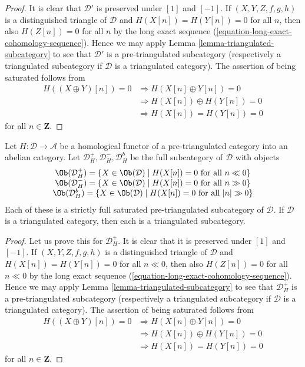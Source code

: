 \begin{proof}
It is clear that $\mathcal{D}'$ is preserved under $[1]$ and $[-1]$.
If $(X, Y, Z, f, g, h)$ is a distinguished triangle of $\mathcal{D}$
and $H(X[n]) = H(Y[n]) = 0$ for all $n$, then also $H(Z[n]) = 0$ for all $n$
by the long exact sequence (\ref{equation-long-exact-cohomology-sequence}).
Hence we may apply
Lemma \ref{lemma-triangulated-subcategory}
to see that $\mathcal{D}'$ is a pre-triangulated subcategory (respectively
a triangulated subcategory if $\mathcal{D}$ is a triangulated category).
The assertion of being saturated follows from
\begin{align*}
H((X \oplus Y)[n]) = 0 & \Rightarrow H(X[n] \oplus Y[n]) = 0 \\
& \Rightarrow H(X[n]) \oplus H(Y[n]) = 0 \\
& \Rightarrow H(X[n]) = H(Y[n]) = 0
\end{align*}
for all $n \in \mathbf{Z}$.
\end{proof}

\begin{lemma}
\label{lemma-homological-functor-bounded}
Let $H : \mathcal{D} \to \mathcal{A}$ be a homological functor of
a pre-triangulated category into an abelian category.
Let $\mathcal{D}_H^{+}, \mathcal{D}_H^{-}, \mathcal{D}_H^b$
be the full subcategory of $\mathcal{D}$ with objects
$$
\begin{matrix}
\Ob(\mathcal{D}_H^{+}) =
\{X \in \Ob(\mathcal{D}) \mid
H(X[n]) = 0\text{ for all }n \ll 0\} \\
\Ob(\mathcal{D}_H^{-}) =
\{X \in \Ob(\mathcal{D}) \mid
H(X[n]) = 0\text{ for all }n \gg 0\} \\
\Ob(\mathcal{D}_H^b) =
\{X \in \Ob(\mathcal{D}) \mid
H(X[n]) = 0\text{ for all }|n| \gg 0\}
\end{matrix}
$$
Each of these is a strictly full saturated pre-triangulated subcategory
of $\mathcal{D}$. If $\mathcal{D}$ is a triangulated category, then
each is a triangulated subcategory.
\end{lemma}

\begin{proof}
Let us prove this for $\mathcal{D}_H^{+}$.
It is clear that it is preserved under $[1]$ and $[-1]$.
If $(X, Y, Z, f, g, h)$ is a distinguished triangle of $\mathcal{D}$
and $H(X[n]) = H(Y[n]) = 0$ for all $n \ll 0$, then also $H(Z[n]) = 0$
for all $n \ll 0$ by the long exact sequence
(\ref{equation-long-exact-cohomology-sequence}).
Hence we may apply
Lemma \ref{lemma-triangulated-subcategory}
to see that $\mathcal{D}_H^{+}$ is a pre-triangulated subcategory
(respectively a triangulated subcategory if $\mathcal{D}$ is a
triangulated category). The assertion of being saturated follows from
\begin{align*}
H((X \oplus Y)[n]) = 0 & \Rightarrow H(X[n] \oplus Y[n]) = 0 \\
& \Rightarrow H(X[n]) \oplus H(Y[n]) = 0 \\
& \Rightarrow H(X[n]) = H(Y[n]) = 0
\end{align*}
for all $n \in \mathbf{Z}$.
\end{proof}


